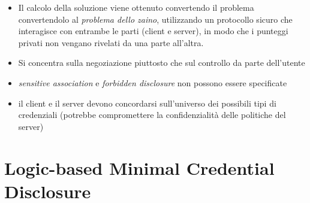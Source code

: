 \documentclass{report}
\begin{document}
\begin{itemize}
    \item Il calcolo della soluzione viene ottenuto convertendo il problema convertendolo 
    al \textit{problema dello zaino}, utilizzando un protocollo sicuro che interagisce con entrambe le parti (client e server), in modo 
    che i punteggi privati non vengano rivelati da una parte all'altra.
    \item Si concentra sulla negoziazione piuttosto che sul controllo da parte dell'utente 
    \item \textit{sensitive association} e \textit{forbidden disclosure} non possono essere specificate
    \item il client e il server devono concordarsi sull'universo dei possibili tipi di credenziali (potrebbe compromettere la confidenzialità delle politiche del server)
\end{itemize}


\chapter{Logic-based Minimal Credential Disclosure}
\end{document}

